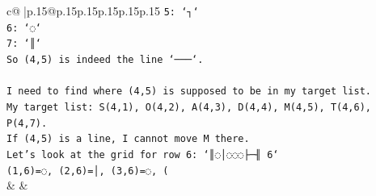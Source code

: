 \documentclass{article}
\begin{document}
{\begin{supertabular}{c@{$\;$}|p{.15\linewidth}@{}p{.15\linewidth}p{.15\linewidth}p{.15\linewidth}p{.15\linewidth}p{.15\linewidth}}
{{{\texttt{5: `┐`} \\
\texttt{6: `◌`} \\
\texttt{7: `║`} \\
\texttt{So (4,5) is indeed the line `───`.} \\
\\ 
\texttt{I need to find where (4,5) is supposed to be in my target list.} \\
\texttt{My target list: S(4,1), O(4,2), A(4,3), D(4,4), M(4,5), T(4,6), P(4,7).} \\
\texttt{If (4,5) is a line, I cannot move M there.} \\
\texttt{Let's look at the grid for row 6: `║◌│◌◌◌├─╢ 6`} \\
\texttt{(1,6)=◌, (2,6)=│, (3,6)=◌, (} \\
            }
        }
    }
    & & \\ \\


\end{supertabular}}
\end{document}
